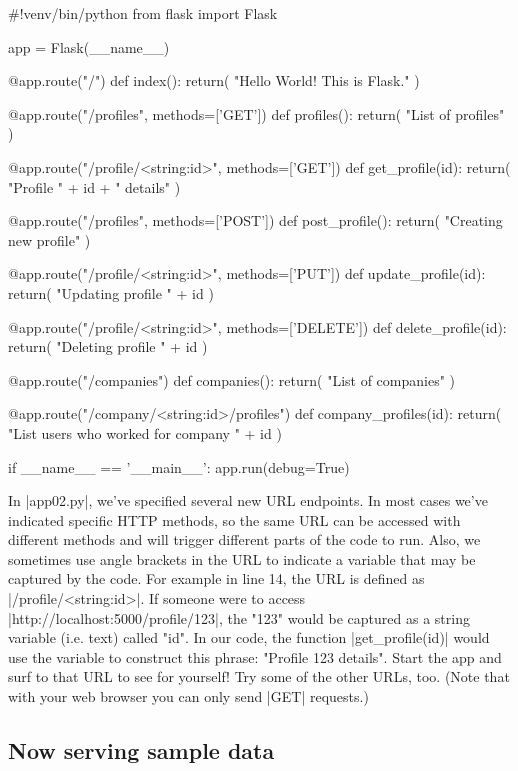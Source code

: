 \documentclass[11pt]{book}
\begin{document}
\begin{pycode}
#!venv/bin/python
from flask import Flask

app = Flask(__name__)

@app.route("/")
def index():
    return( "Hello World! This is Flask." )
    
@app.route("/profiles", methods=['GET'])
def profiles():
    return( "List of profiles" )
    
@app.route("/profile/<string:id>", methods=['GET'])
def get_profile(id):
    return( "Profile " + id + " details" )
    
@app.route("/profiles", methods=['POST'])
def post_profile():
    return( "Creating new profile" )
    
@app.route("/profile/<string:id>", methods=['PUT'])
def update_profile(id):
    return( "Updating profile " + id )
    
@app.route("/profile/<string:id>", methods=['DELETE'])
def delete_profile(id):
    return( "Deleting profile " + id )
    
@app.route("/companies")
def companies():
    return( "List of companies" )
    
@app.route("/company/<string:id>/profiles")
def company_profiles(id):
    return( "List users who worked for company " + id )
    
if __name__ == '__main__':
    app.run(debug=True)
\end{pycode}

In |app02.py|, we've specified several new URL endpoints.  In most cases we've indicated specific HTTP methods, so the same URL can be accessed with different methods and will trigger different parts of the code to run.  Also, we sometimes use angle brackets in the URL to indicate a variable that may be captured by the code.  For example in line 14, the URL is defined as |/profile/<string:id>|.  If someone were to access |http://localhost:5000/profile/123|, the "123" would be captured as a string variable (i.e. text) called "id".  In our code, the function |get_profile(id)| would use the variable to construct this phrase: "Profile 123 details".  Start the app and surf to that URL to see for yourself!  Try some of the other URLs, too.  (Note that with your web browser you can only send |GET| requests.)

\subsection*{Now serving sample data}
\end{document}
